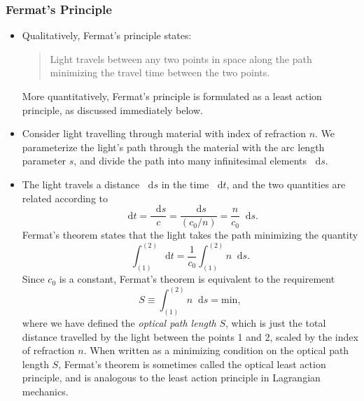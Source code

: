 \documentclass[11pt, a4paper]{article}
\newcommand{\diff}{\mathop{}\!\mathrm{d}} %
\begin{document}
\subsubsection{Fermat's Principle}
\begin{itemize}
    \item Qualitatively, Fermat's principle states:
    \begin{quote}
        Light travels between any two points in space along the path minimizing the travel time between the two points.
    \end{quote}
    More quantitatively, Fermat's principle is formulated as a least action principle, as discussed immediately below.

    \item Consider light travelling through material with index of refraction $ n $. We parameterize the light's path through the material with the arc length parameter $ s $, and divide the path into many infinitesimal elements $ \diff s $. 

    \item The light travels a distance $ \diff s $ in the time $ \diff t $, and the two quantities are related according to
    \begin{equation*}
        \diff t = \frac{\diff s}{c} = \frac{\diff s}{(c_{0}/n)} = \frac{n}{c_{0}}\diff s.
    \end{equation*}
    Fermat's theorem states that the light takes the path minimizing the quantity
    \begin{equation*}
        \int_{(1)}^{(2)} \diff t = \frac{1}{c_{0}}\int_{(1)}^{(2)} n \diff s.
    \end{equation*}
    Since $ c_{0} $ is a constant, Fermat's theorem is equivalent to the requirement
    \begin{equation*}
        S \equiv \int_{(1)}^{(2)}n \diff s = \text{min},
    \end{equation*}
    where we have defined the \textit{optical path length} $ S $, which is just the total distance travelled by the light between the points 1 and 2, scaled by the index of refraction $ n $. When written as a minimizing condition on the optical path length $ S $, Fermat's theorem is sometimes called the optical least action principle, and is analogous to the least action principle in Lagrangian mechanics.
    
\end{itemize}
\end{document}
